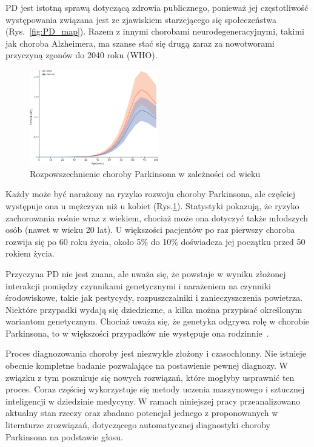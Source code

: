 PD jest istotną sprawą dotyczącą zdrowia publicznego, ponieważ jej częstotliwość występowania związana jest ze zjawiskiem starzejącego się społeczeństwa (Rys.~\ref{fig:PD_map}).
Razem z innymi chorobami neurodegeneracyjnymi, takimi jak choroba Alzheimera, ma szanse stać się drugą zaraz za nowotworami przyczyną zgonów do 2040 roku (WHO).

\begin{figure}[htbp]
	\centering
	\includegraphics[width=0.5\textwidth]{./img/PD_prevalence}
	\caption{Rozpowszechnienie choroby Parkinsona w zależności od wieku \cite {global_PD}}
    \label{fig:PD_prevalance}
\end{figure}

Każdy może być narażony na ryzyko rozwoju choroby Parkinsona, ale częściej występuje ona u mężczyzn niż u kobiet (Rys.\ref{fig:PD_prevalance}).
Statystyki pokazują, że ryzyko zachorowania rośnie wraz z wiekiem, chociaż może ona dotyczyć także młodszych osób (nawet w wieku 20 lat).
U większości pacjentów po raz pierwszy choroba rozwija się po 60 roku życia, około 5\% do 10\% doświadcza jej początku przed 50 rokiem życia.

Przyczyna PD nie jest znana, ale uważa się, że powstaje w wyniku złożonej interakcji pomiędzy czynnikami genetycznymi i
narażeniem na czynniki środowiskowe, takie jak pestycydy, rozpuszczalniki i zanieczyszczenia powietrza.
Niektóre przypadki wydają się dziedziczne, a kilka można przypisać określonym wariantom genetycznym.
Chociaż uważa się, że genetyka odgrywa rolę w chorobie Parkinsona, to w większości przypadków nie występuje ona  rodzinnie~\cite{National_Institute_on_Aging_2022}.

Proces diagnozowania choroby jest niezwykle złożony i czasochłonny.
Nie istnieje obecnie kompletne badanie pozwalające na postawienie pewnej diagnozy.
W związku z tym poszukuje się nowych rozwiązań, które mogłyby usprawnić ten proces.
Coraz częściej wykorzystuje się metody uczenia maszynowego i sztucznej inteligencji w dziedzinie medycyny.
W ramach niniejszej pracy przeanalizowano aktualny stan rzeczy oraz zbadano potencjał jednego z proponowanych w literaturze zrozwiązań, dotyczącego automatycznej diagnostyki
choroby Parkinsona na podstawie głosu.

